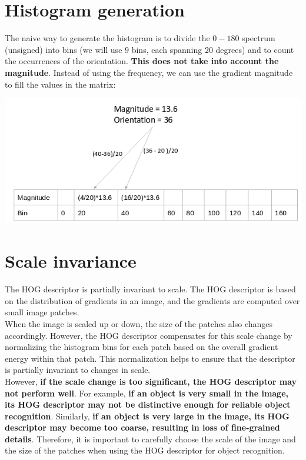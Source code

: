 \documentclass{article}
\begin{document}
\newpage

\section*{Histogram generation}

The naive way to generate the histogram is to divide the $0-180$ spectrum (unsigned) into bins (we will use $9$ bins, each spanning $20$ degrees) and to count the occurrences of the orientation. \textbf{This does not take into account the magnitude}. Instead of using the frequency, we can use the gradient magnitude to fill the values in the matrix: 

\begin{center}
    \includegraphics[width=.9\linewidth]{images/hog_histogram.png}
\end{center}

\newpage

\section*{Scale invariance}

The HOG descriptor is partially invariant to scale. The HOG descriptor is based on the distribution of gradients in an image, and the gradients are computed over small image patches. \\

When the image is scaled up or down, the size of the patches also changes accordingly. However, the HOG descriptor compensates for this scale change by normalizing the histogram bins for each patch based on the overall gradient energy within that patch. This normalization helps to ensure that the descriptor is partially invariant to changes in scale. \\

However, \textbf{if the scale change is too significant, the HOG descriptor may not perform well}. For example, \textbf{if an object is very small in the image, its HOG descriptor may not be distinctive enough for reliable object recognition}. Similarly, \textbf{if an object is very large in the image, its HOG descriptor may become too coarse, resulting in loss of fine-grained details}. Therefore, it is important to carefully choose the scale of the image and the size of the patches when using the HOG descriptor for object recognition.
\end{document}
